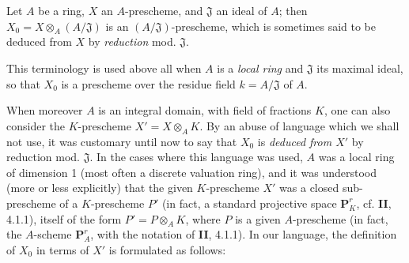 \begin{env}[3.7.1]
\label{I.3.7.1}
Let $A$ be a ring, $X$ an $A$-prescheme, and $\mathfrak{J}$ an ideal of $A$;
then $X_0=X\otimes_A(A/\mathfrak{J})$ is an
$(A/\mathfrak{J})$-prescheme, which is sometimes said to be deduced from $X$ by
\emph{reduction} mod. $\mathfrak{J}$.
\end{env}

\begin{env}[3.7.2]
\label{I.3.7.2}
This terminology is used above all when $A$ is a \emph{local
ring} and $\mathfrak{J}$ its maximal ideal, so that $X_0$ is a
prescheme over the residue field $k=A/\mathfrak{J}$ of $A$.

When moreover $A$ is an integral domain, with field of fractions $K$, one can
also consider the $K$-prescheme $X'=X\otimes_A K$. By an abuse of language which
we shall not use, it was customary until now to say that $X_0$ is
\emph{deduced from $X'$} by reduction mod. $\mathfrak{J}$. In the cases where
this language was used, $A$ was a local ring of dimension 1 (most
often a discrete valuation ring), and it was understood (more or less
explicitly) that the given $K$-prescheme $X'$ was a
closed sub-prescheme of a $K$-prescheme $P'$ (in fact, a standard projective
space $\mathbf{P}_K^r$, cf. \textbf{II}, 4.1.1), itself of the form
$P'=P\otimes_A K$, where $P$ is a given $A$-prescheme (in fact, the $A$-scheme
$\mathbf{P}_A^r$, with the notation of \textbf{II}, 4.1.1). In our language, the
definition of $X_0$ in terms of $X'$ is formulated as follows:


\end{env}
